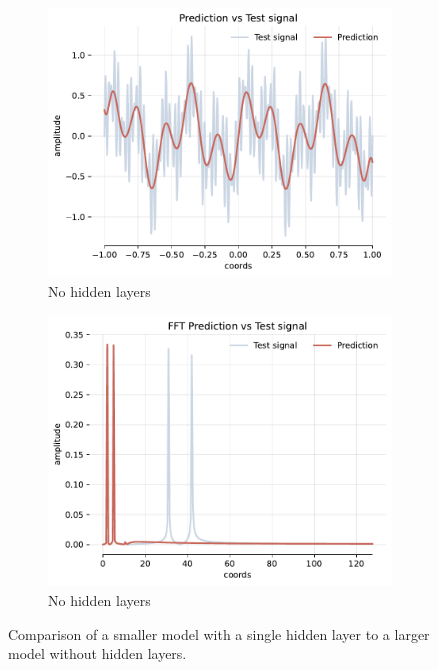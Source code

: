 \begin{figure}[h!]
    \begin{subfigure}[b]{0.40\textwidth}
        \centering
        \includegraphics[width=\textwidth]{img/ch3/prediction_0hl_1024hf_w10.pdf}
        \caption{No hidden layers}
        \label{fig:rec-0hl-1024-w10hf}
    \end{subfigure}
    \begin{subfigure}[b]{0.40\textwidth}
        \centering
        \includegraphics[width=\textwidth]{img/ch3/fft_0hl_1024hf_w10.pdf}
        \caption{No hidden layers}
        \label{fig:fft-0hl-1024-w10hf}
    \end{subfigure}
    \caption{Comparison of a smaller model with a single hidden layer to a larger model without hidden layers.}
    \label{f:hidden-layer-vs-no-hiddel-layer}
\end{figure}

